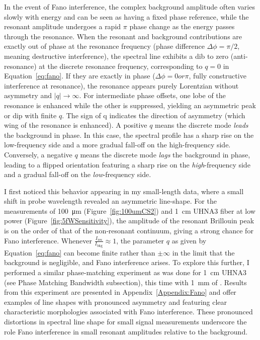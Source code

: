 In the event of Fano interference, the complex background amplitude often varies slowly with energy and can be seen as having a fixed phase reference, while the resonant amplitude undergoes a rapid \(\pi\) phase change as the energy passes through the resonance. \cite{limonov2017fano} When the resonant and background contributions are exactly out of phase at the resonance frequency (phase difference \(\Delta\phi = \pi/2\), meaning destructive interference), the spectral line exhibits a dib to zero (anti-resonance) at the discrete resonance frequency, corresponding to \(q=0\) in Equation~\ref{eq:fano}. If they are exactly in phase (\(\Delta\phi = 0 or \pi\), fully constructive interference at resonance), the resonance appears purely Lorentzian without asymmetry and \(|q| \to \infty\). For intermediate phase offsets, one lobe of the resonance is enhanced while the other is suppressed, yielding an asymmetric peak or dip with finite \(q\). The sign of q indicates the direction of asymmetry (which wing of the resonance is enhanced). A positive \(q\) means the discrete mode \textit{leads} the background in phase. In this case, the spectral profile has a sharp rise on the low-frequency side and a more gradual fall-off on the high-frequency side. Conversely, a negative \(q\) means the discrete mode \textit{lags} the background in phase, leading to a flipped orientation featuring a sharp rise on the \textit{high}-frequency side and a gradual fall-off on the \textit{low}-frequency side.

I first noticed this behavior appearing in my small-length  data, where a small shift in probe wavelength revealed an asymmetric line-shape. For the measurements of \SI{100}{\micro\meter}  (Figure~\ref{fig:100umCS2}) and \SI{1}{\centi\meter} \ac{UHNA3} fiber at low power (Figure~\ref{fig:5fWSensitivity}), the amplitude of the resonant Brillouin peak is on the order of that of the non‐resonant continuum, giving a strong chance for Fano interference. Whenever \(\tfrac{I_{\text{res}}}{I_{\text{bkg}}}\approx 1\), the parameter \(q\) as given by Equation~\ref{eq:fano} can become finite rather than \(\pm \infty\) in the limit that the background is negligible, and Fano interference arises. To explore this further, I performed a similar phase-matching experiment as was done for \SI{1}{\centi\meter} \ac{UHNA3} (see Phase Matching Bandwidth subsection), this time with \SI{1}{\milli\meter} of . Results from this experiment are presented in Appendix~\ref{Appendix:Fano} and offer examples of line shapes with pronounced asymmetry and featuring clear characteristic morphologies associated with Fano interference. These pronounced distortions in spectral line shape for small signal measurements underscore the role Fano interference in small resonant amplitudes relative to the background.

